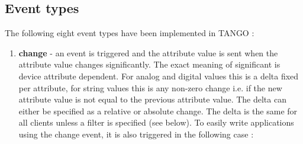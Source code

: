 \subsection{Event types}

The following eight event types have been implemented in TANGO :
\begin{enumerate}
\item \textbf{change} - an event is triggered and the attribute
value is sent when the attribute value changes significantly. The
exact meaning of significant is device attribute dependent. For analog
and digital values this is a delta fixed per attribute, for string
values this is any non-zero change i.e. if the new attribute value
is not equal to the previous attribute value. The delta can either
be specified as a relative or absolute change. The delta is the same
for all clients unless a filter is specified (see below). To easily
write applications using the change event, it is also triggered in
the following case :


\end{enumerate}
